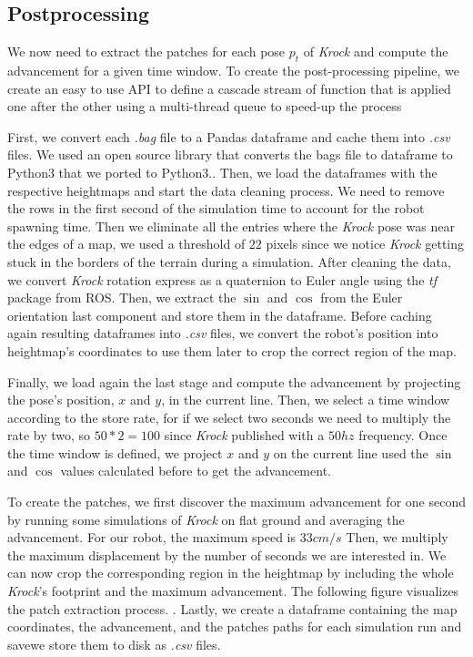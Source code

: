 \documentclass[../document.tex]{subfiles}
\begin{document}
\subsection{Postprocessing}
We now need to extract the patches for each pose $p_t$ of \emph{Krock} and compute the advancement for a given time window. To create the post-processing pipeline, we create an easy to use API  to define a cascade stream of function that is applied one after the other using a multi-thread queue to speed-up the process

First, we convert each \emph{.bag} file to a Pandas dataframe and cache them into \emph{.csv} files. We used an open source library that converts the bags file to dataframe to Python3 that we ported to Python3..
Then, we load the dataframes with the respective heightmaps and start the data cleaning process. We need to remove the rows in the first second of the simulation time to account for the robot spawning time. Then we eliminate all the entries where the \emph{Krock} pose was near the edges of a map, we used a threshold of $22$ pixels since we notice  \emph{Krock} getting stuck in the borders of the terrain during a simulation. 
After cleaning the data, we convert \emph{Krock} rotation express as a quaternion to Euler angle using the \emph{tf} package  from ROS. Then, we extract the $\sin$ and $\cos$ from the Euler orientation last component and store them in the dataframe.
Before caching again resulting dataframes into \emph{.csv} files, we convert the robot's position into heightmap's coordinates to use them later to crop the correct region of the map.

Finally, we load again the last stage and compute the advancement by projecting the pose's position, $x$ and $y$, in the current line. Then, we select a time window according to the store rate, for if we select two seconds we need to multiply the rate by two, so $50*2=100$ since \emph{Krock} published with a $50hz$ frequency. Once the time window is defined, we project $x$ and $y$ on the current line used the $\sin$ and $\cos$ values calculated before to get the advancement.

To create the patches, we first discover the maximum advancement for one second by running some simulations of \emph{Krock} on flat ground and averaging the advancement. For our robot, the maximum speed is $33cm/s$ Then, we multiply the maximum displacement by the number of seconds we are interested in. We can now crop the corresponding region in the heightmap by including the whole \emph{Krock}'s footprint and the maximum advancement. The following figure visualizes the patch extraction process. 
. Lastly, we create a dataframe containing the map coordinates, the advancement, and the patches paths for each simulation run and savewe store them to disk as \emph{.csv} files. 
\end{document}
